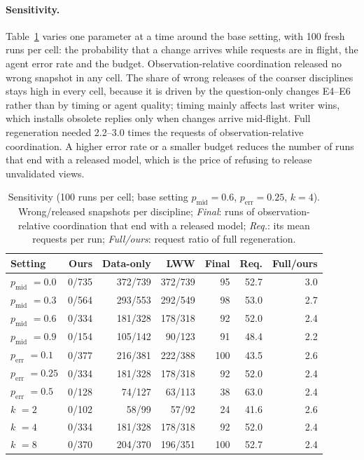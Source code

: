 \documentclass[pdflatex,sn-mathphys-num]{sn-jnl}
\theoremstyle{thmstyleone}%
\theoremstyle{thmstyletwo}%
\theoremstyle{thmstylethree}%
\newcommand{\SimPerr}{0.25}
\newcommand{\SimBudget}{4}
\newcommand{\SimPmid}{0.6}
\newcommand{\SweepRuns}{100}
\newcommand{\SweepRatioMin}{2.2}
\newcommand{\SweepRatioMax}{3.0}
\begin{document}
\paragraph{Sensitivity.} Table~\ref{tab:sweep} varies one parameter at a time around the base setting, with \SweepRuns{} fresh runs per cell: the probability that a change arrives while requests are in flight, the agent error rate and the budget. Observation-relative coordination released no wrong snapshot in any cell. The share of wrong releases of the coarser disciplines stays high in every cell, because it is driven by the question-only changes E4--E6 rather than by timing or agent quality; timing mainly affects last writer wins, which installs obsolete replies only when changes arrive mid-flight. Full regeneration needed \SweepRatioMin--\SweepRatioMax{} times the requests of observation-relative coordination. A higher error rate or a smaller budget reduces the number of runs that end with a released model, which is the price of refusing to release unvalidated views.

\begin{table}[!ht]
\caption{Sensitivity (\SweepRuns{} runs per cell; base setting $p_{\mathrm{mid}}=\SimPmid$, $p_{\mathrm{err}}=\SimPerr$, $k=\SimBudget$). Wrong/released snapshots per discipline; \emph{Final}: runs of observation-relative coordination that end with a released model; \emph{Req.}: its mean requests per run; \emph{Full/ours}: request ratio of full regeneration.}\label{tab:sweep}
\footnotesize\setlength{\tabcolsep}{4pt}
\begin{tabular}{@{}lrrrrrr@{}}\toprule
Setting & Ours & Data-only & LWW & Final & Req. & Full/ours\\\midrule
$p_{\mathrm{mid}}$ $=0.0$ & 0/735 & 372/739 & 372/739 & 95 & 52.7 & 3.0 \\
$p_{\mathrm{mid}}$ $=0.3$ & 0/564 & 293/553 & 292/549 & 98 & 53.0 & 2.7 \\
$p_{\mathrm{mid}}$ $=0.6$ & 0/334 & 181/328 & 178/318 & 92 & 52.0 & 2.4 \\
$p_{\mathrm{mid}}$ $=0.9$ & 0/154 & 105/142 & 90/123 & 91 & 48.4 & 2.2 \\
$p_{\mathrm{err}}$ $=0.1$ & 0/377 & 216/381 & 222/388 & 100 & 43.5 & 2.6 \\
$p_{\mathrm{err}}$ $=0.25$ & 0/334 & 181/328 & 178/318 & 92 & 52.0 & 2.4 \\
$p_{\mathrm{err}}$ $=0.5$ & 0/128 & 74/127 & 63/113 & 38 & 63.0 & 2.4 \\
$k$ $=2$ & 0/102 & 58/99 & 57/92 & 24 & 41.6 & 2.6 \\
$k$ $=4$ & 0/334 & 181/328 & 178/318 & 92 & 52.0 & 2.4 \\
$k$ $=8$ & 0/370 & 204/370 & 196/351 & 100 & 52.7 & 2.4 \\
\bottomrule
\end{tabular}
\end{table}
\end{document}
